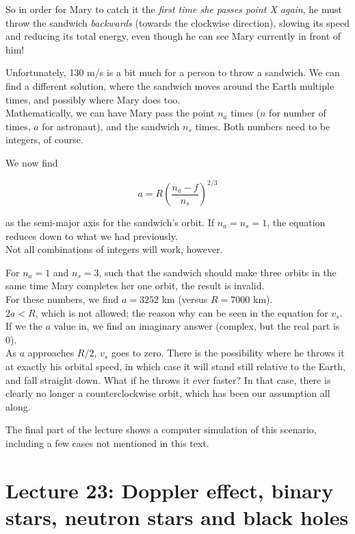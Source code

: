\documentclass[8.01x]{subfiles}
\begin{document}
So in order for Mary to catch it the \emph{first time she passes point X again}, he must throw the sandwich \emph{backwards} (towards the clockwise direction), slowing its speed and reducing its total energy, even though he can see Mary currently in front of him!

Unfortunately, 130 m/s is a bit much for a person to throw a sandwich. We can find a different solution, where the sandwich moves around the Earth multiple times, and possibly where Mary does too.\\
Mathematically, we can have Mary pass the point $n_a$ times ($n$ for number of times, $a$ for astronaut), and the sandwich $n_s$ times. Both numbers need to be integers, of course.

We now find

\begin{equation}
a = R \left(\frac{n_a - f}{n_s}\right)^{2/3}
\end{equation}

as the semi-major axis for the sandwich's orbit. If $n_a = n_s = 1$, the equation reduces down to what we had previously.\\
Not all combinations of integers will work, however.

For $n_a = 1$ and $n_s = 3$, such that the sandwich should make three orbits in the same time Mary completes her one orbit, the result is invalid.\\
For these numbers, we find $a = 3252$ km (versus $R = 7000$ km).\\
$2a < R$, which is not allowed; the reason why can be seen in the equation for $v_s$. If we the $a$ value in, we find an imaginary answer (complex, but the real part is 0).\\
As $a$ approaches $R/2$, $v_s$ goes to zero. There is the possibility where he throws it at exactly his orbital speed, in which case it will stand still relative to the Earth, and fall straight down. What if he throws it ever faster? In that case, there is clearly no longer a counterclockwise orbit, which has been our assumption all along.

The final part of the lecture shows a computer simulation of this scenario, including a few cases not mentioned in this text.

\section{Lecture 23: Doppler effect, binary stars, neutron stars and black holes}
\end{document}

